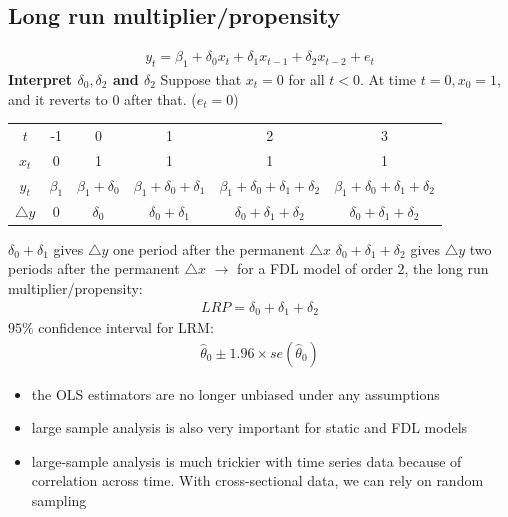 \documentclass[a4paper,twoside,11pt]{article}
\begin{document}
\subsection{Long run multiplier/propensity}
\begin{equation*}
\begin{aligned}
    y_t = \beta_1 + \delta_0 x_t + \delta_1 x_{t-1} + \delta_2 x_{t-2} + e_t
\end{aligned}
\end{equation*}
\textbf{\textcolor{NavyBlue}{Interpret $\delta_0,\delta_2$ and $\delta_2$}}
\noindent Suppose that $x_t=0$ for all $t<0$. At time $t=0,  x_0 =1$, and it reverts to $0$ after that. ($e_t=0$)
\begin{center}
\begin{tabular}{ c c c c c c  } 
 \hline
 $t$ &  -1 & 0 & 1 & 2 & 3  \\
 $x_t$  & 0 & 1 & 1 & 1 & 1  \\ 
 $y_t$ & $\beta_1$ & $\beta_1 + \delta_0$ & $\beta_1 +\delta_0+ \delta_1$ & $\beta_1 +\delta_0+ \delta_1 + \delta_2$ & $\beta_1+\delta_0+ \delta_1 + \delta_2$  \\
 $\bigtriangleup y$  & 0 & $\delta_0$ & $\delta_0+ \delta_1$ & $\delta_0+ \delta_1+\delta_2$ & $\delta_0+ \delta_1+\delta_2$\\
 \hline
\end{tabular}
\end{center}
\textcolor{NavyBlue}{$\delta_0+\delta_1$} gives $\bigtriangleup y$ one period after the permanent $\bigtriangleup x$ 
\newline
\textcolor{NavyBlue}{$\delta_0 + \delta_1 + \delta_2$} gives $\bigtriangleup y$ two periods after the permanent $\bigtriangleup x$
\newline
$\rightarrow$ for a FDL model of order $2$, the long run multiplier/propensity:
\begin{equation*}
\begin{aligned}
    LRP = \delta_0 + \delta_1 + \delta_2
\end{aligned}
\end{equation*}
$95\%$ confidence interval for LRM:
\begin{equation*}
\begin{aligned}
    \hat \theta_0 \pm 1.96 \times se(\hat \theta_0)
\end{aligned}
\end{equation*}
\begin{itemize}
    \item the OLS estimators are no longer unbiased under any assumptions
    \item large sample analysis is also very important for static and FDL models
    \item large-sample analysis is much trickier with time series data because of correlation across time. With cross-sectional data, we can rely on random sampling
\end{itemize}
\end{document}
